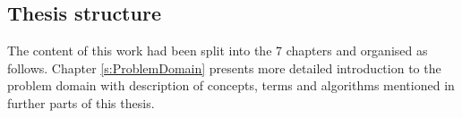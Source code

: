 \subsection{Thesis structure}\label{s:Introduction:Structure}


The content of this work had been split into the 7 chapters and organised as follows.
Chapter \ref{s:ProblemDomain} presents more detailed introduction to the problem domain with description of concepts, terms and algorithms mentioned in further parts of this thesis.

